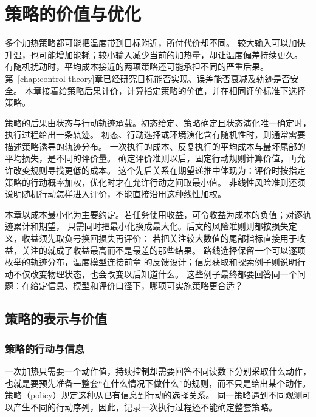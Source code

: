 \chapter{策略的价值与优化}
\label{chap:decision-theory-and-dynamic-risk}
\label{chap:policy-value-and-optimization}

多个加热策略都可能把温度带到目标附近，所付代价却不同。
较大输入可以加快升温，也可能增加能耗；较小输入减少当前的加热量，却让温度偏差持续更久。
有随机扰动时，平均成本接近的两项策略还可能承担不同的严重后果。
第~\ref{chap:control-theory}章已经研究目标能否实现、误差能否衰减及轨迹是否安全。
本章接着给策略后果计价，计算指定策略的价值，并在相同评价标准下选择策略。

策略的后果由状态与行动轨迹承载。初态给定、策略确定且状态演化唯一确定时，执行过程给出一条轨迹。
初态、行动选择或环境演化含有随机性时，则通常需要描述策略诱导的轨迹分布。
一次执行的成本、反复执行的平均成本与最坏尾部的平均损失，是不同的评价量。
确定评价准则以后，固定行动规则计算价值，再允许改变规则寻找更低的成本。
这个先后关系在期望递推中体现为：评价时按指定策略的行动概率加权，优化时才在允许行动之间取最小值。
非线性风险准则还须说明随机行动怎样进入评价，不能直接沿用这种线性加权。

本章以成本最小化为主要约定。若任务使用收益，可令收益为成本的负值；对逐轨迹累计和期望，
只需同时把最小化换成最大化。后文的风险准则则都按损失定义，收益须先取负号换回损失再评价：
若把关注较大数值的尾部指标直接用于收益，关注的就成了收益最高而不是最差的那些结果。
路线选择保留一个可以逐项枚举的轨迹分布，温度模型连接前章
的反馈设计；信息获取和探索例子则说明行动不仅改变物理状态，也会改变以后知道什么。
这些例子最终都要回答同一个问题：在给定信息、模型和评价口径下，哪项可实施策略更合适？

\section{策略的表示与价值}
\label{sec:policy-representation-and-value}

\subsection{策略的行动与信息}
\label{sec:policy-actions-and-information}

一次加热只需要一个动作值，持续控制却需要回答不同读数下分别采取什么动作，也就是要预先准备一整套“在什么情况下做什么”的规则，而不只是给出某个动作。
策略（policy）规定这种从已有信息到行动的选择关系。
同一策略遇到不同观测可以产生不同的行动序列，因此，记录一次执行过程还不能确定整套策略。

